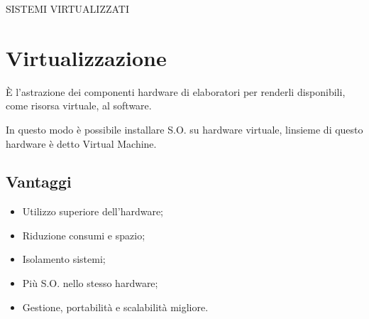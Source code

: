 \documentclass[
]{article}
\author{}
\date{}
\providecommand{\tightlist}{%
  \setlength{\itemsep}{0pt}\setlength{\parskip}{0pt}}
\begin{document}
{}

{SISTEMI VIRTUALIZZATI}

{}

{}

{}

\section{\texorpdfstring{{Virtualizzazione}}{Virtualizzazione}}\label{h.8tyq566c7yxy}

{}

{È l'astrazione dei componenti hardware di elaboratori per renderli
disponibili, come risorsa virtuale, al software.}

{}

{In questo modo è possibile installare S.O. su hardware virtuale,
l\textquotesingle insieme di questo hardware è detto Virtual Machine.}

\subsection{\texorpdfstring{{Vantaggi}}{Vantaggi}}\label{h.icgp4fuvi9em}

\begin{itemize}
\tightlist
\item
  {Utilizzo superiore dell'hardware;}
\end{itemize}

{}

\begin{itemize}
\tightlist
\item
  {Riduzione consumi e spazio;}
\end{itemize}

{}

\begin{itemize}
\tightlist
\item
  {Isolamento sistemi;}
\end{itemize}

{}

\begin{itemize}
\tightlist
\item
  {Più S.O. nello stesso hardware;}
\end{itemize}

{}

\begin{itemize}
\tightlist
\item
  {Gestione, portabilità e scalabilità migliore.}
\end{itemize}
\end{document}
